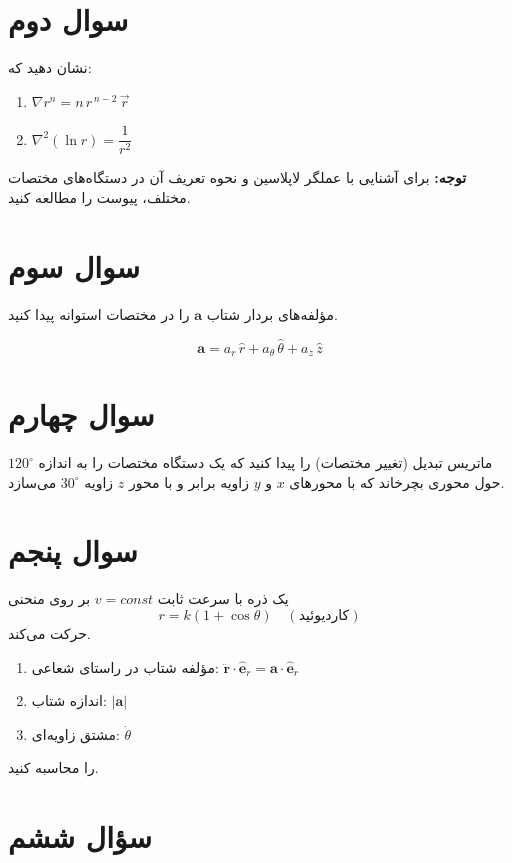 \documentclass[a4paper,16pt]{article}
\begin{document}
	\section{سوال دوم}
	
	
	نشان دهید که:
	
	\begin{enumerate}
		\item $\nabla r^n = n\, r^{\,n-2} \,\vec{r}$
		\item $\nabla^2 (\ln r) = \dfrac{1}{r^2}$
	\end{enumerate}
	
	\textbf{توجه:} برای آشنایی با عملگر لاپلاسین و نحوه تعریف آن در دستگاه‌های مختصات مختلف، پیوست را مطالعه کنید.
	
	
	\section{سوال سوم}
	مؤلفه‌های بردار شتاب $\mathbf{a}$ را در مختصات استوانه پیدا کنید.
	
	\[
	\mathbf{a} = a_r \,\hat{r} + a_\theta \,\hat{\theta} + a_z \,\hat{z}
	\]
	
	\section{سوال چهارم}
	
	ماتریس تبدیل (تغییر مختصات) را پیدا کنید که یک دستگاه مختصات را به اندازه $120^\circ$ حول محوری بچرخاند که با محورهای $x$ و $y$ زاویه برابر و با محور $z$ زاویه $30^\circ$ می‌سازد.
	
	\section{سوال پنجم}
	
	
	یک ذره با سرعت ثابت $v = {const}$ بر روی منحنی 
	\[
	r = k(1 + \cos \theta) \quad (\text{کاردیوئید})
	\]
	حرکت می‌کند.
	
	\begin{enumerate}
		\item مؤلفه شتاب در راستای شعاعی: $\ddot{\mathbf{r}} \cdot \hat{\mathbf{e}}_r = \mathbf{a} \cdot \hat{\mathbf{e}}_r$
		\item اندازه شتاب: $|\mathbf{a}|$
		\item مشتق زاویه‌ای: $\dot{\theta}$
	\end{enumerate}
	را محاسبه کنید.
	
	\section{سؤال ششم}
	
\end{document}
